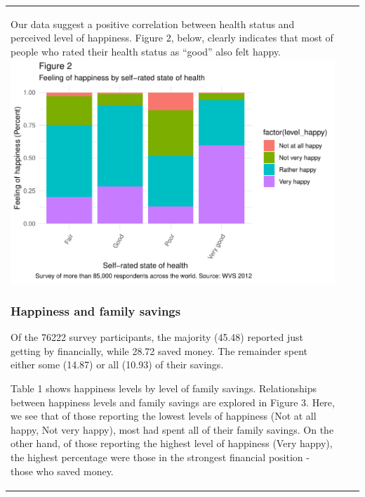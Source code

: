 \documentclass[man, fleqn, noextraspace,floatsintext]{apa6}
\begin{document}
\begin{tabular}{l|l|r}
Our data suggest a positive correlation between health status and
perceived level of happiness. Figure 2, below, clearly indicates that
most of people who rated their health status as \enquote{good} also felt
happy.
\includegraphics{610_final_files/figure-latex/unnamed-chunk-2-1.pdf}

\subsubsection{Happiness and family
savings}\label{happiness-and-family-savings}

Of the 76222 survey participants, the majority (45.48) reported just
getting by financially, while 28.72 saved money. The remainder spent
either some (14.87) or all (10.93) of their savings.

Table 1 shows happiness levels by level of family savings. Relationships
between happiness levels and family savings are explored in Figure 3.
Here, we see that of those reporting the lowest levels of happiness (Not
at all happy, Not very happy), most had spent all of their family
savings. On the other hand, of those reporting the highest level of
happiness (Very happy), the highest percentage were those in the
strongest financial position - those who saved money.


\end{tabular}
\end{document}
